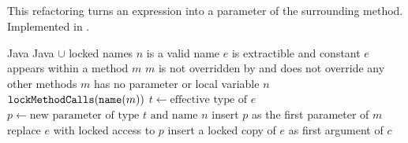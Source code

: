 \subsection{}
This refactoring turns an expression into a parameter of the surrounding method. Implemented in .

\begin{algorithm}
\caption{$\refactoring{Introduce Parameter}(e : \type{Expr}, n : \type{Name})$}
\begin{algorithmic}[1]
\REQUIRE Java
\ENSURE Java $\cup$ locked names
\medskip
\STATE \assert $n$ is a valid name
\STATE \assert $e$ is extractible and constant
\STATE \assert $e$ appears within a method $m$
\STATE \assert $m$ is not overridden by and does not override any other methods
\STATE \assert $m$ has no parameter or local variable $n$
\STATE $\text{\texttt{lockMethodCalls}}(\text{\texttt{name}}(m))$
\STATE $t \leftarrow \text{effective type of $e$}$
\STATE $p \leftarrow \text{new parameter of type $t$ and name $n$}$
\STATE insert $p$ as the first parameter of $m$
\STATE replace $e$ with locked access to $p$
  \STATE insert a locked copy of $e$ as first argument of $c$
\ENDFOR
\end{algorithmic}
\end{algorithm}
